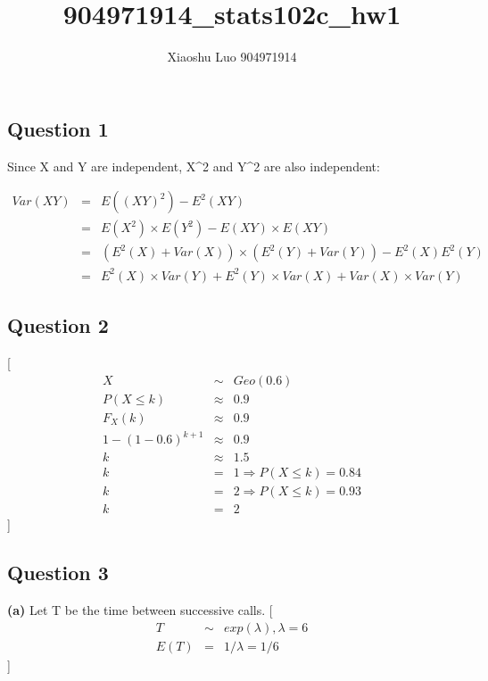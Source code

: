 \documentclass[
]{article}
\title{904971914\_stats102c\_hw1}
\author{Xiaoshu Luo 904971914}
\date{}
\begin{document}
\maketitle

\hypertarget{question-1}{%
\subsection{Question 1}\label{question-1}}

Since X and Y are independent, X\^{}2 and Y\^{}2 are also independent:

\[
\begin{eqnarray}
Var(XY) 
& = & E((XY)^2)-E^2(XY)\\
& = & E(X^2)\times E(Y^2)-E(XY)\times E(XY)\\
& = &  (E^2(X)+Var(X)) \times (E^2(Y)+Var(Y)) - E^2(X)E^2(Y)\\
& = &  E^2(X)\times Var(Y) + E^2(Y)\times Var(X) + Var(X) \times Var(Y) 
\end{eqnarray}
\]

\hypertarget{question-2}{%
\subsection{Question 2}\label{question-2}}

{[} \begin{eqnarray}

X & \sim & Geo(0.6)\\
P(X \leq k) & \approx & 0.9\\
F_X(k)& \approx & 0.9\\
1-(1-0.6)^{k+1}& \approx & 0.9\\
k &\approx &  1.5\\
k &=& 1\Rightarrow P(X \leq k)=0.84\\
k&=&2\Rightarrow P(X \leq k)=0.93\\
k &=& 2


\end{eqnarray} {]}

\hypertarget{question-3}{%
\subsection{Question 3}\label{question-3}}

\textbf{(a)} Let T be the time between successive calls. {[}
\begin{eqnarray}

T &\sim& exp(\lambda),\lambda=6\\
E(T) &=& 1/\lambda = 1/6
 
\end{eqnarray} {]}
\end{document}
